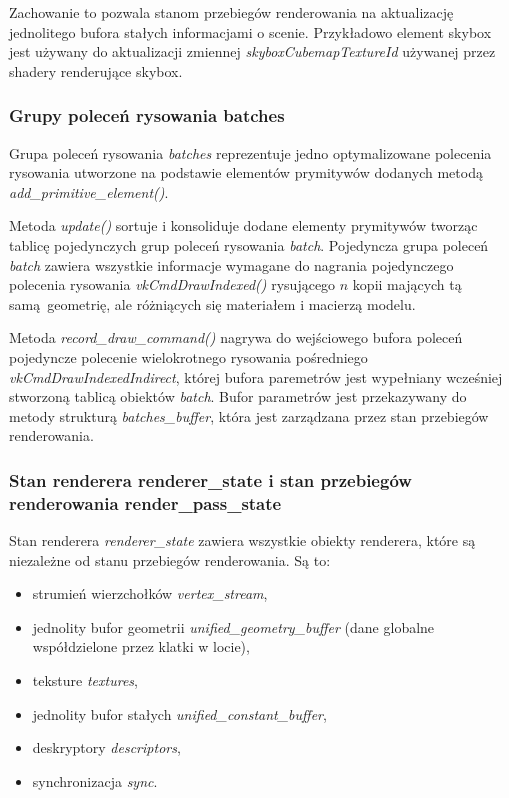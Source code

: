 Zachowanie to pozwala stanom przebiegów renderowania na aktualizację jednolitego bufora stałych informacjami o scenie.
Przykładowo element skybox jest używany do aktualizacji zmiennej \textit{skyboxCubemapTextureId} używanej przez shadery renderujące skybox.


\subsubsection{Grupy poleceń rysowania batches}
Grupa poleceń rysowania \textit{batches} reprezentuje jedno optymalizowane polecenia rysowania utworzone na podstawie elementów prymitywów dodanych metodą \textit{add\_primitive\_element()}.

Metoda \textit{update()} sortuje i konsoliduje dodane elementy prymitywów tworząc tablicę pojedynczych grup poleceń rysowania \textit{batch}.
Pojedyncza grupa poleceń \textit{batch} zawiera wszystkie informacje wymagane do nagrania pojedynczego polecenia rysowania \textit{vkCmdDrawIndexed()} rysującego $n$ kopii mających tą samą geometrię, ale różniących się materiałem i macierzą modelu.

Metoda \textit{record\_draw\_command()} nagrywa do wejściowego bufora poleceń pojedyncze polecenie wielokrotnego rysowania pośredniego \textit{vkCmdDrawIndexedIndirect}, której bufora paremetrów jest wypełniany wcześniej stworzoną tablicą obiektów \textit{batch}.
Bufor parametrów jest przekazywany do metody strukturą \textit{batches\_buffer}, która jest zarządzana przez stan przebiegów renderowania.


\subsubsection{Stan renderera renderer\_state i stan przebiegów renderowania render\_pass\_state}
Stan renderera \textit{renderer\_state} zawiera wszystkie obiekty renderera, które są niezależne od stanu przebiegów renderowania.
Są to:
\begin{itemize}
	\item strumień wierzchołków \textit{vertex\_stream},
	\item jednolity bufor geometrii \textit{unified\_geometry\_buffer} (dane globalne współdzielone przez klatki w locie),
	\item teksture \textit{textures},
	\item jednolity bufor stałych \textit{unified\_constant\_buffer},
	\item deskryptory \textit{descriptors},
	\item synchronizacja \textit{sync}.
\end{itemize}

